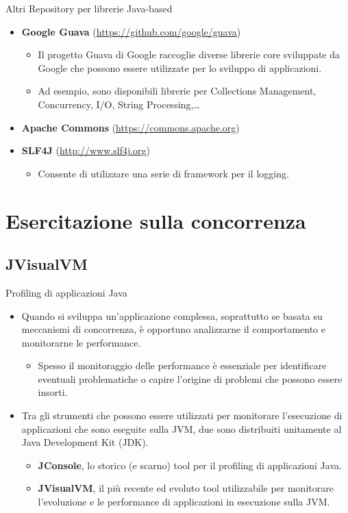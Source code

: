 \documentclass[presentation]{beamer}
\begin{document}
\begin{frame}{Altri Repository per librerie Java-based}
\begin{itemize}\itemsep15pt
\item \textbf{Google Guava} (\url{https://github.com/google/guava})
\begin{itemize}
\item Il progetto Guava di Google raccoglie diverse librerie core sviluppate da Google che possono essere utilizzate per lo sviluppo di applicazioni.
\item Ad esempio, sono disponibili librerie per Collections Management, Concurrency, I/O, String Processing,\dots
\end{itemize}
\item \textbf{Apache Commons} (\url{https://commons.apache.org})
\item \textbf{SLF4J} (\url{http://www.slf4j.org})
\begin{itemize}
\item Consente di utilizzare una serie di framework per il logging.
\end{itemize}
\end{itemize}
\end{frame}

\section{Esercitazione sulla concorrenza}

\subsection{JVisualVM}

\begin{frame}{Profiling di applicazioni Java}
\begin{itemize}\itemsep10pt
\item Quando si sviluppa un'applicazione complessa, soprattutto se basata su meccanismi di concorrenza, è opportuno analizzarne il comportamento e monitorarne le performance.
\begin{itemize}
\item Spesso il monitoraggio delle performance è essenziale per identificare eventuali problematiche o capire l'origine di problemi che possono essere insorti.
\end{itemize}
\item Tra gli strumenti che possono essere utilizzati per monitorare l'esecuzione di applicazioni che sono eseguite sulla JVM, due sono distribuiti unitamente al Java Development Kit (JDK).
\begin{itemize}
\item \textbf{JConsole}, lo storico (e scarno) tool per il profiling di applicazioni Java.
\item \textbf{JVisualVM}, il più recente ed evoluto tool utilizzabile per monitorare l'evoluzione e le performance di applicazioni in esecuzione sulla JVM.
\end{itemize}
\end{itemize}
\end{frame}
\end{document}
